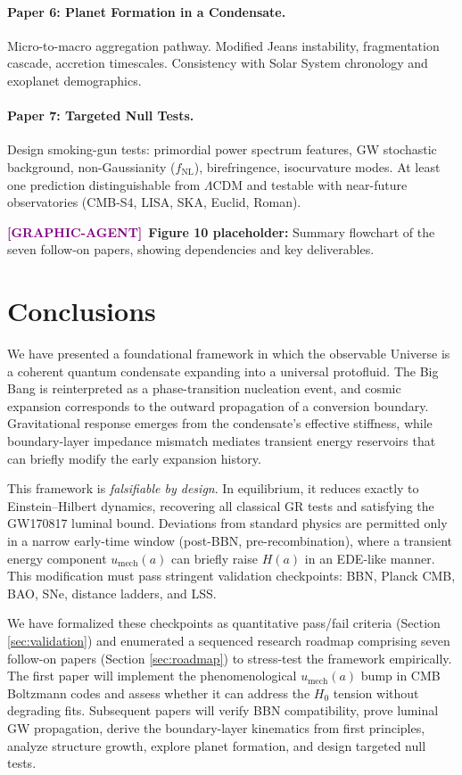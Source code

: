 \documentclass[11pt,a4paper]{article}
\newcommand{\umech}{u_{\mathrm{mech}}}
\theoremstyle{definition}
\newcommand{\GRAPHAGENT}{\textcolor{purple}{\textbf{[GRAPHIC-AGENT]}}}
\begin{document}
\paragraph{Paper 6: Planet Formation in a Condensate.}
Micro-to-macro aggregation pathway. Modified Jeans instability, fragmentation cascade, accretion timescales. Consistency with Solar System chronology and exoplanet demographics.

\paragraph{Paper 7: Targeted Null Tests.}
Design smoking-gun tests: primordial power spectrum features, GW stochastic background, non-Gaussianity ($f_{\mathrm{NL}}$), birefringence, isocurvature modes. At least one prediction distinguishable from $\Lambda$CDM and testable with near-future observatories (CMB-S4, LISA, SKA, Euclid, Roman).

\GRAPHAGENT~\textbf{Figure 10 placeholder:} Summary flowchart of the seven follow-on papers, showing dependencies and key deliverables.

\section{Conclusions}
\label{sec:conclusions}

We have presented a foundational framework in which the observable Universe is a coherent quantum condensate expanding into a universal protofluid. The Big Bang is reinterpreted as a phase-transition nucleation event, and cosmic expansion corresponds to the outward propagation of a conversion boundary. Gravitational response emerges from the condensate's effective stiffness, while boundary-layer impedance mismatch mediates transient energy reservoirs that can briefly modify the early expansion history.

This framework is \emph{falsifiable by design}. In equilibrium, it reduces exactly to Einstein--Hilbert dynamics, recovering all classical GR tests and satisfying the GW170817 luminal bound. Deviations from standard physics are permitted only in a narrow early-time window (post-BBN, pre-recombination), where a transient energy component $\umech(a)$ can briefly raise $H(a)$ in an EDE-like manner. This modification must pass stringent validation checkpoints: BBN, Planck CMB, BAO, SNe, distance ladders, and LSS.

We have formalized these checkpoints as quantitative pass/fail criteria (Section \ref{sec:validation}) and enumerated a sequenced research roadmap comprising seven follow-on papers (Section \ref{sec:roadmap}) to stress-test the framework empirically. The first paper will implement the phenomenological $\umech(a)$ bump in CMB Boltzmann codes and assess whether it can address the $H_0$ tension without degrading fits. Subsequent papers will verify BBN compatibility, prove luminal GW propagation, derive the boundary-layer kinematics from first principles, analyze structure growth, explore planet formation, and design targeted null tests.
\end{document}
